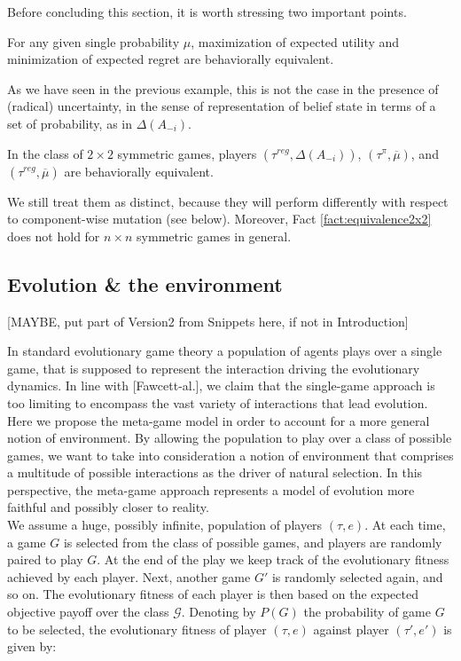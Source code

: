 \documentclass[fleqn,reqno,11pt]{article}
\begin{document}
Before concluding this section, it is worth stressing two important points.

\begin{fact} \label{fact:maxEU-minReg}

For any given single probability $\mu$, maximization of expected utility and minimization of expected regret are behaviorally equivalent.

\end{fact}

\noindent As we have seen in the previous example, this is not the case in the presence of (radical) uncertainty, in the sense of representation of belief state in terms of a set of probability, as in $ \Delta(A_{-i}) $.

\begin{fact} \label{fact:equivalence2x2}

In the class of $2 \times 2$ symmetric games, players $(\tau^{reg}, \Delta(A_{-i}))$, $(\tau^{\pi}, \overline{\mu})$, and $(\tau^{reg},\overline{\mu})$ are behaviorally equivalent.

\end{fact} 

\noindent We still treat them as distinct, because they will perform differently with respect to component-wise mutation (see below). Moreover, Fact \ref{fact:equivalence2x2} does not hold for $n \times n$ symmetric games in general.

\subsection{Evolution \& the environment}

[MAYBE, put part of Version2 from Snippets here, if not in Introduction]

In standard evolutionary game theory a population of agents plays over a single game, that is supposed to represent the interaction driving the evolutionary dynamics. In line with [Fawcett-al.], we claim that the single-game approach is too limiting to encompass the vast variety of interactions that lead evolution. Here we propose the meta-game model in order to account for a more general notion of environment. By allowing the population to play over a class of possible games, we want to take into consideration a notion of environment that comprises a multitude of possible interactions as the driver of natural selection. In this perspective, the meta-game approach represents a model of evolution more faithful and possibly closer to reality. \\
We assume a huge, possibly infinite, population of players $(\tau,e)$. At each time, a game $G$ is selected from the class of possible games, and players are randomly paired to play $G$. At the end of the play we keep track of the evolutionary fitness achieved by each player. Next, another game $G'$ is randomly selected again, and so on. The evolutionary fitness of each player is then based on the expected objective payoff over the class $\mathcal{G}$. Denoting by $P(G)$ the probability of game $G$ to be selected, the evolutionary fitness of player $(\tau,e)$ against player $(\tau',e')$ is given by: 
\end{document}
